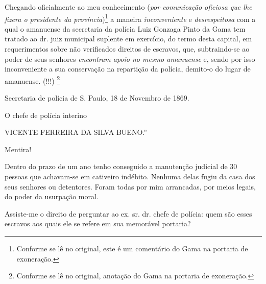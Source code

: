 Chegando oficialmente ao meu conhecimento (\emph{por comunicação
oficiosa que lhe fizera o presidente da província})\footnote{Conforme
  se lê no original, este é um comentário do Gama na portaria de
  exoneração.} a maneira \emph{inconveniente} e \emph{desrespeitosa} com
a qual o amanuense da secretaria da polícia Luiz Gonzaga Pinto da Gama
tem tratado ao dr. juiz municipal suplente em exercício, do termo desta
capital, em requerimentos sobre não verificados direitos de escravos,
que, subtraindo-se ao poder de seus senhores \emph{encontram apoio no
mesmo amanuense} e, sendo por isso inconveniente a sua conservação na
repartição da polícia, demito-o do lugar de amanuense. (!!!) \footnote{
  Conforme se lê no original, anotação do Gama na portaria de
  exoneração.}

Secretaria de polícia de S. Paulo, 18 de Novembro de 1869.

O chefe de polícia interino

VICENTE FERREIRA DA SILVA BUENO.''

Mentira!

Dentro do prazo de um ano tenho conseguido a manutenção judicial de 30
pessoas que achavam-se em cativeiro indébito. Nenhuma delas fugiu da
casa dos seus senhores ou detentores. Foram todas por mim arrancadas,
por meios legais, do poder da usurpação moral.

Assiste-me o direito de perguntar ao ex. sr. dr. chefe de polícia: quem
são esses escravos aos quais ele se refere em sua memorável portaria?

